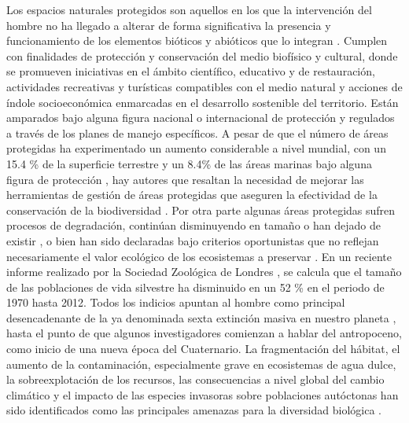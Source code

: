 \documentclass[twocolumn]{extarticle}
\begin{document}
Los espacios naturales protegidos son aquellos en los que la
intervención del hombre no ha llegado a alterar de forma significativa
la presencia y funcionamiento de los elementos bióticos y abióticos que
lo integran \citep{Bravo2008}. Cumplen con finalidades de protección y
conservación del medio biofísico y cultural, donde se promueven
iniciativas en el ámbito científico, educativo y de restauración,
actividades recreativas y turísticas compatibles con el medio natural y
acciones de índole socioeconómica enmarcadas en el desarrollo sostenible
del territorio. Están amparados bajo alguna figura nacional o
internacional de protección y regulados a través de los planes de manejo
específicos. A pesar de que el número de áreas protegidas ha
experimentado un aumento considerable a nivel mundial, con un 15.4 \% de
la superficie terrestre y un 8.4\% de las áreas marinas bajo alguna
figura de protección \citep{juffe2014protected} , hay autores que
resaltan la necesidad de mejorar las herramientas de gestión de áreas
protegidas que aseguren la efectividad de la conservación de la
biodiversidad \citep{Chape2005}. Por otra parte algunas áreas protegidas
sufren procesos de degradación, continúan disminuyendo en tamaño o han
dejado de existir \citep{Mascia2011}, o bien han sido declaradas bajo
criterios oportunistas que no reflejan necesariamente el valor ecológico
de los ecosistemas a preservar \citep{Knight2007}. En un reciente
informe realizado por la Sociedad Zoológica de Londres
\citep{Living2016} , se calcula que el tamaño de las poblaciones de vida
silvestre ha disminuido en un 52 \% en el periodo de 1970 hasta 2012.
Todos los indicios apuntan al hombre como principal desencadenante de la
ya denominada sexta extinción masiva en nuestro planeta
\citep{Barnosky2011}, hasta el punto de que algunos investigadores
comienzan a hablar del antropoceno, como inicio de una nueva época del
Cuaternario. La fragmentación del hábitat, el aumento de la
contaminación, especialmente grave en ecosistemas de agua dulce, la
sobreexplotación de los recursos, las consecuencias a nivel global del
cambio climático y el impacto de las especies invasoras sobre
poblaciones autóctonas han sido identificados como las principales
amenazas para la diversidad biológica \citep{Conabio2017}.
\end{document}
